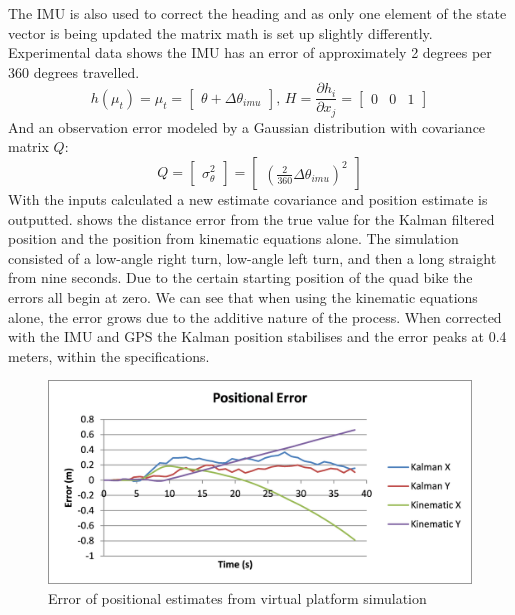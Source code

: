 \documentclass[main.tex]{subfiles}
\begin{document}
The IMU is also used to correct the heading and as only one element of the state vector is being updated the matrix math is set up slightly differently. Experimental data shows the IMU has an error of approximately 2 degrees per 360 degrees travelled. 
\[
h(\mu_t) = \mu_t = 
\begin{bmatrix}
    \theta + \Delta \theta_{imu}
\end{bmatrix}
\textrm{, } H = \frac{\partial h_i}{\partial x_j} = 
\begin{bmatrix}
    0	&	0	&	1
\end{bmatrix}
\]
And an observation error modeled by a Gaussian distribution with covariance matrix $Q$:
\[
Q = 
\begin{bmatrix}
    \sigma_\theta^2
\end{bmatrix}
=
\begin{bmatrix}
    (\frac{2}{360}\Delta \theta_{imu})^2
\end{bmatrix}
\]
With the inputs calculated a new estimate covariance and position estimate is outputted. 
 shows the distance error from the true value for the Kalman filtered position and the position from kinematic equations alone. The simulation consisted of a low-angle right turn, low-angle left turn, and then a long straight from nine seconds. Due to the certain starting position of the quad bike the errors all begin at zero. We can see that when using the kinematic equations alone, the error grows due to the additive nature of the process. When corrected with the IMU and GPS the Kalman position stabilises and the error peaks at 0.4 meters, within the specifications.
\begin{figure}[ht]
\includegraphics[width=\textwidth]{5-DetailedDesign/KalmanErrorGraph.png}
\centering
\caption{Error of positional estimates from virtual platform simulation} 
\end{figure}
\end{document}
